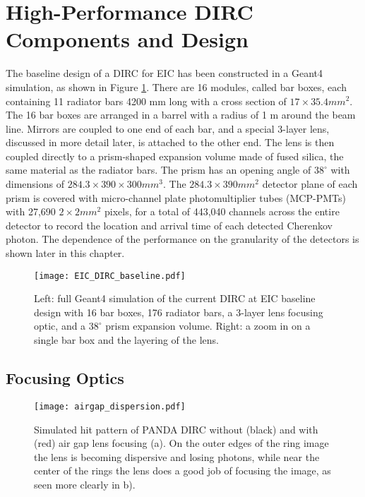\section{High-Performance DIRC Components and Design}
The baseline design of a DIRC for EIC has been constructed in a Geant4 simulation, as shown in Figure \ref{fig:baseline_design}. There are 16 modules, called bar boxes, each containing 11 radiator bars 4200 mm long with a cross section of $17\times35.4\unit{mm}^2$. The 16 bar boxes are arranged in a barrel with a radius of 1 m around the beam line. Mirrors are coupled to one end of each bar, and a special 3-layer lens, discussed in more detail later, is attached to the other end. The lens is then coupled directly to a prism-shaped expansion volume made of fused silica, the same material as the radiator bars. The prism has an opening angle of $38^\circ$ with dimensions of $284.3\times390\times300\unit{mm}^3$. The $284.3\times390\unit{mm}^2$ detector plane of each prism is covered with micro-channel plate photomultiplier tubes (MCP-PMTs) with 27,690 $2\times2\unit{mm}^2$ pixels, for a total of 443,040 channels across the entire detector to record the location and arrival time of each detected Cherenkov photon. The dependence of the performance on the granularity of the detectors is shown later in this chapter.

\begin{figure}[!htb]
	\centering
	\texttt{[image: EIC\_DIRC\_baseline.pdf]}
	\caption{Left: full Geant4 simulation of the current DIRC at EIC baseline design with 16 bar boxes, 176 radiator bars, a 3-layer lens focusing optic, and a $38^\circ$ prism expansion volume. Right: a zoom in on a single bar box and the layering of the lens.}
	\label{fig:baseline_design}
\end{figure}

\subsection{Focusing Optics}

\begin{figure}[!htb]
	\centering
	\texttt{[image: airgap\_dispersion.pdf]}
	\caption{Simulated hit pattern of PANDA DIRC without (black) and with (red) air gap lens focusing (a). On the outer edges of the ring image the lens is becoming dispersive  and losing photons, while near the center of the rings the lens does a good job of focusing the image, as seen more clearly in b).}
	\label{fig:airgap_dispersion}
\end{figure}

